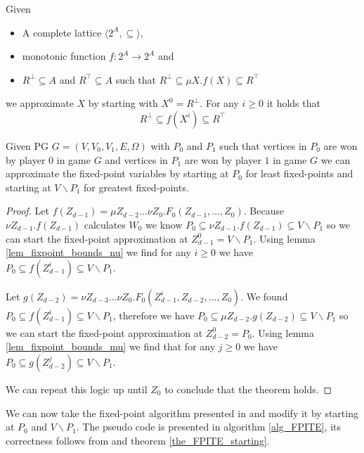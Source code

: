\begin{lemma}
	\label{lem_fixpoint_bounds_mu}
	Given
	\begin{itemize}
		\item A complete lattice $\langle 2^A, \subseteq \rangle$,
		\item monotonic function $f : 2^A \rightarrow 2^A$ and
		\item $R^\bot \subseteq A$ and $R^\top \subseteq A$ such that $R^\bot \subseteq \mu X. f(X) \subseteq R^\top$
	\end{itemize}
	we approximate $X$ by starting with $X^0 = R^\bot$. For any $i \geq 0$ it holds that
	\[ R^\bot \subseteq f(X^i) \subseteq R^\top \]
\end{lemma}

\begin{theorem}
	\label{the_FPITE_starting}
	Given PG $G = (V,V_0,V_1,E,\Omega)$ with $P_0$ and $P_1$ such that vertices  in $P_0$ are won by player $0$ in game $G$ and vertices in $P_1$ are won by player $1$ in game $G$ we can approximate the fixed-point variables by starting at $P_0$ for least fixed-points and starting at $V \backslash P_1$ for greatest fixed-points.
	\begin{proof}
		Let $f(Z_{d-1}) = \mu Z_{d-2}\dots\nu Z_0.F_0(Z_{d-1},\dots,Z_0)$. Because $\nu Z_{d-1}.f(Z_{d-1})$ calculates $W_0$ we know $P_0 \subseteq \nu Z_{d-1}.f(Z_{d-1}) \subseteq V \backslash P_1$ so we can start the fixed-point approximation at $Z_{d-1}^0 = V\backslash P_1$. Using lemma \ref{lem_fixpoint_bounds_nu} we find for any $i \geq 0$ we have $P_0 \subseteq f(Z_{d-1}^i) \subseteq V \backslash P_1$.
		
		Let $g(Z_{d-2}) = \nu Z_{d-3} \dots \nu Z_0. F_0(Z_{d-1}^i,Z_{d-2},\dots,Z_0)$. We found $P_0 \subseteq f(Z_{d-1}^i) \subseteq V \backslash P_1$, therefore we have $P_0 \subseteq \mu Z_{d-2}.g(Z_{d-2})\subseteq V \backslash P_1$ so we can start the fixed-point approximation at $Z_{d-2}^0 = P_0$. Using lemma \ref{lem_fixpoint_bounds_mu} we find that for any $j \geq 0$ we have $P_0 \subseteq g(Z_{d-2}^j) \subseteq V\backslash P_1$.
		
		We can repeat this logic up until $Z_0$ to conclude that the theorem holds.
	\end{proof}
\end{theorem}
We can now take the fixed-point algorithm presented in \cite{FPITE} and modify it by starting at $P_0$ and $V \backslash P_1$. The pseudo code is presented in algorithm \ref{alg_FPITE}, its correctness follows from \cite{FPITE} and theorem \ref{the_FPITE_starting}.
